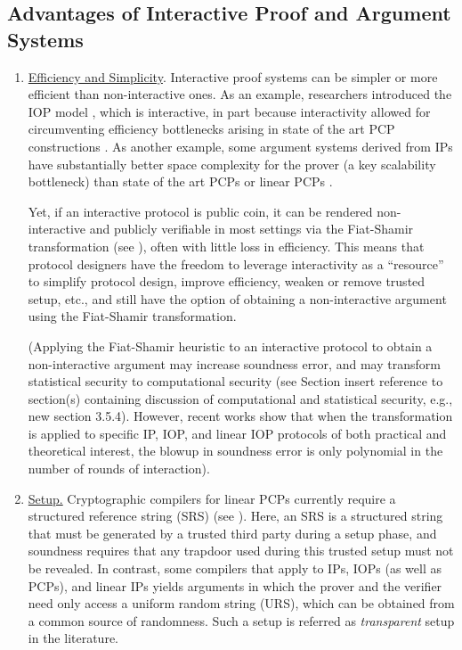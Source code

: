 \subsection{Advantages of Interactive Proof and Argument Systems}
\label{advantagesofinteraction}
\begin{enumerate}[label=\alph*.]
\item \underline{Efficiency and Simplicity}. Interactive proof systems can be simpler or more efficient than non-interactive ones.
As an example, researchers introduced the IOP model \cite{2016:tcc:IOPs, 2016:stoc:Constant-round-Interactive-Proofs-for-Delegating-Computation}, which is interactive, in part because interactivity allowed for circumventing efficiency bottlenecks arising
in state of the art PCP constructions \cite{2013:STOC:concrete-efficiency-PCPs}. 
As another example, some argument systems derived from IPs \cite{2018:SP:Doubly-efficient-zkSNARKs-without-trusted-setup, 2019:crypto:libra}
have substantially better space complexity for the prover (a key scalability bottleneck) than state of the art PCPs \cite{2013:STOC:concrete-efficiency-PCPs} or linear PCPs \cite{2013:QSPs-and-succinct-NIZKs-without-PCPs, 2016:Eurocrypt:On-the-Size-of-Pairing-Based-Non-interactive-Arguments}. 

Yet, if an interactive protocol is public coin, it can be rendered non-interactive and publicly verifiable in most settings via the Fiat-Shamir transformation (see ), often with little loss in efficiency. This means that protocol designers have the freedom to leverage interactivity as a ``resource'' to simplify protocol design, improve efficiency, weaken or remove trusted setup, etc., and still have the option of obtaining a non-interactive argument using the Fiat-Shamir transformation.

(Applying the Fiat-Shamir heuristic to an interactive protocol to obtain a non-interactive argument may increase soundness error, and may transform statistical security to computational security (see Section {\color{red} insert reference to section(s) containing discussion of computational and statistical security, e.g., new section 3.5.4}). However, recent works \cite{2016:tcc:IOPs, 2019:STC:Fiat-Shamir-from-practice-to-theory} show 
that when the transformation is applied to specific IP, IOP, and linear IOP protocols of both practical and theoretical interest, the blowup in soundness error is only polynomial in the number of rounds of interaction). 


\item \underline{Setup.} Cryptographic compilers for linear PCPs currently require a structured reference string (SRS) (see ). 
Here, an SRS is a structured string that must be generated by a trusted third party during a setup phase, and soundness requires that any
trapdoor used during this trusted setup must not be revealed. In contrast, some compilers that apply to IPs, IOPs (as well as PCPs), and linear IPs
yields arguments in which the prover and the verifier need only access a uniform random string (URS), which can be obtained
from a common source of randomness. Such a setup is referred as \emph{transparent} setup in the literature.


\end{enumerate}
